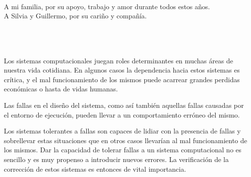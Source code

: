 \documentclass[pdftex,a4paper,12pt]{book}
\begin{document}



%
\newpage
~\\
\newpage


\begin{flushright}
A mi familia, por su apoyo, trabajo y amor durante todos estos a\~nos.\\
A Silvia y Guillermo, por su cari\~no y compa\~{n}\'ia.
\end{flushright}



\newpage
~\\
\newpage
\chapter*{}

Los sistemas computacionales juegan roles determinantes en muchas \'areas de nuestra vida cotidiana. En algunos casos la dependencia hacia estos sistemas es cr\'itica, y el mal funcionamiento de los mismos puede acarrear grandes perdidas econ\'omicas o hasta de vidas humanas.

Las fallas en el dise\~no del sistema, como as\'i tambi\'en aquellas fallas causadas por el entorno de ejecuci\'on, pueden llevar a un comportamiento err\'oneo del mismo.
%

Los sistemas tolerantes a fallas son capaces de lidiar con la presencia de fallas y sobrellevar estas situaciones que en otros casos llevar\'ian al mal funcionamiento de los mismos. Dar la capacidad de tolerar fallas a un sistema computacional no es sencillo y es muy propenso a introducir nuevos errores. La ve\-ri\-fi\-ca\-ci\'on de la correcci\'on de estos sistemas es entonces de vital importancia.
\end{document}
